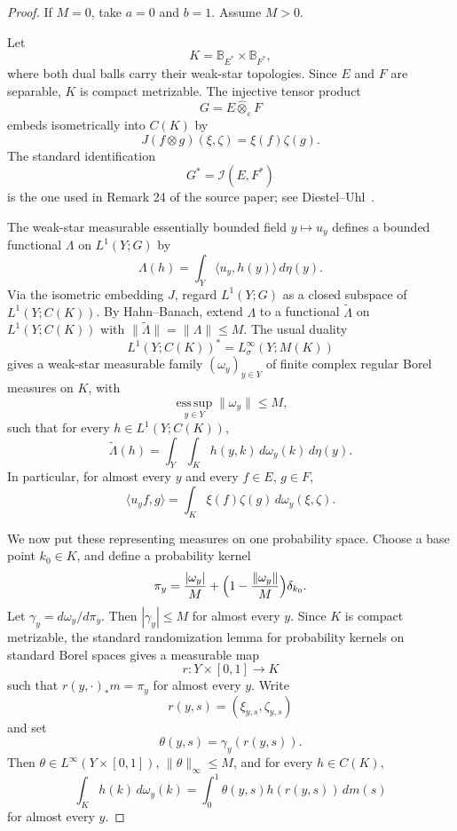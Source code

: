 \documentclass[11pt]{article}
\newcommand{\I}{\mathcal I}
\newcommand{\B}{\mathbb B}
\newcommand{\eps}{\varepsilon}
\newcommand{\wh}{\widehat}
\newcommand{\sig}{\sigma}
\begin{document}
\begin{proof}
If \(M=0\), take \(a=0\) and \(b=1\).  Assume \(M>0\).

Let
\[
K=\B_{E^*}\times \B_{F^*},
\]
where both dual balls carry their weak-star topologies.  Since \(E\) and
\(F\) are separable, \(K\) is compact metrizable.  The injective tensor product
\[
G=E\wh\otimes_\eps F
\]
embeds isometrically into \(C(K)\) by
\[
J(f\otimes g)(\xi,\zeta)=\xi(f)\zeta(g).
\]
The standard identification
\[
G^*=\I(E,F^*)
\]
is the one used in Remark 24 of the source paper; see
Diestel--Uhl~\cite[Chapter VIII, Theorems 5 and 9]{DU}.

The weak-star measurable essentially bounded field \(y\mapsto u_y\) defines a
bounded functional \(\Lambda\) on \(L^1(Y;G)\) by
\[
\Lambda(h)=\int_Y \langle u_y,h(y)\rangle\,d\eta(y).
\]
Via the isometric embedding \(J\), regard \(L^1(Y;G)\) as a closed subspace of
\(L^1(Y;C(K))\).  By Hahn--Banach, extend \(\Lambda\) to a functional
\(\widetilde\Lambda\) on \(L^1(Y;C(K))\) with
\(\|\widetilde\Lambda\|=\|\Lambda\|\le M\).  The usual duality
\[
L^1(Y;C(K))^*=L^\infty_\sig(Y;M(K))
\]
gives a weak-star measurable family \((\omega_y)_{y\in Y}\) of finite complex
regular Borel measures on \(K\), with
\[
\operatorname*{ess\,sup}_{y\in Y}\|\omega_y\|\le M,
\]
such that for every \(h\in L^1(Y;C(K))\),
\[
\widetilde\Lambda(h)=\int_Y\int_K h(y,k)\,d\omega_y(k)\,d\eta(y).
\]
In particular, for almost every \(y\) and every \(f\in E\), \(g\in F\),
\begin{equation}\label{slice-measure}
\langle u_y f,g\rangle
=\int_K \xi(f)\zeta(g)\,d\omega_y(\xi,\zeta).
\end{equation}

We now put these representing measures on one probability space.  Choose a
base point \(k_0\in K\), and define a probability kernel
\[
\pi_y=\frac{|\omega_y|}{M}
 +\Bigl(1-\frac{\|\omega_y\|}{M}\Bigr)\delta_{k_0}.
\]
Let \(\gamma_y=d\omega_y/d\pi_y\).  Then \(|\gamma_y|\le M\) for almost every
\(y\).  Since \(K\) is compact metrizable, the standard randomization lemma
for probability kernels on standard Borel spaces gives a measurable map
\[
r:Y\times[0,1]\longrightarrow K
\]
such that \(r(y,\cdot)_*m=\pi_y\) for almost every \(y\).  Write
\[
r(y,s)=(\xi_{y,s},\zeta_{y,s})
\]
and set
\[
\theta(y,s)=\gamma_y(r(y,s)).
\]
Then \(\theta\in L^\infty(Y\times[0,1])\), \(\|\theta\|_\infty\le M\), and
for every \(h\in C(K)\),
\begin{equation}\label{randomized-kernel}
\int_K h(k)\,d\omega_y(k)
=\int_0^1 \theta(y,s)h(r(y,s))\,dm(s)
\end{equation}
for almost every \(y\).


\end{proof}
\end{document}
